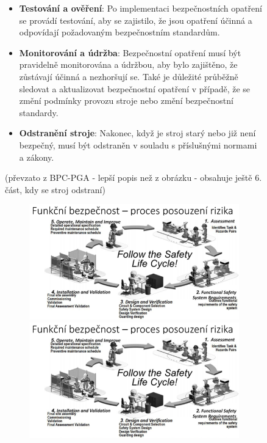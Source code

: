 \begin{figure}[h]
\begin{itemize}
    \item \textbf{Testování a ověření}: Po implementaci bezpečnostních opatření se provádí testování, aby se zajistilo, že jsou opatření účinná a odpovídají požadovaným bezpečnostním standardům.
    \item \textbf{Monitorování a údržba}: Bezpečnostní opatření musí být pravidelně monitorována a údržbou, aby bylo zajištěno, že zůstávají účinná a nezhoršují se. Také je důležité průběžně sledovat a aktualizovat bezpečnostní opatření v případě, že se změní podmínky provozu stroje nebo změní bezpečnostní standardy.
    \item \textbf{Odstranění stroje}: Nakonec, když je stroj starý nebo již není bezpečný, musí být odstraněn v souladu s příslušnými normami a zákony.
\end{itemize}
(převzato z BPC-PGA - lepší popis než z obrázku - obsahuje ještě 6. část, kdy se stroj odstraní)

\begin{figure}[h]
  \begin{center}
    \includegraphics[scale = 1]{img/Picture21.png}
  \end{center}
    \begin{center}
        \includegraphics[scale = 1]{img/Picture21.png}
    \end{center}
\end{figure}


\end{figure}
